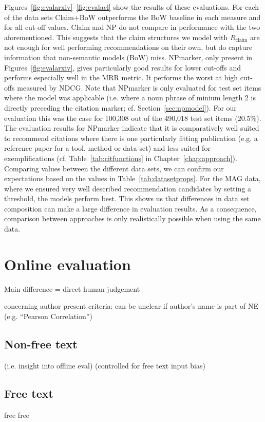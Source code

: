 Figures~\ref{fig:evalarxiv}--\ref{fig:evalacl} show the results of these evaluations. For each of the data sets Claim+BoW outperforms the BoW baseline in each measure and for all cut-off values. Claim and NP do not compare in performance with the two aforementioned. This suggests that the claim structures we model with $R_{\text{claim}}$ are not enough for well performing recommendations on their own, but do capture information that non-semantic models (BoW) miss. NPmarker, only present in Figures~\ref{fig:evalarxiv}, gives particularly good results for lower cut-offs and performs especially well in the MRR metric. It performs the worst at high cut-offs measured by NDCG. Note that NPmarker is only evaluated for test set items where the model was applicable (i.e. where a noun phrase of minium length 2 is directly preceding the citation marker; cf. Section~\ref{sec:npmodel}). For our evaluation this was the case for 100,308 out of the 490,018 test set items (20.5\%). The evaluation results for NPmarker indicate that it is comparatively well suited to recommend citations where there is one particularly fitting publication (e.g. a reference paper for a tool, method or data set) and less suited for exemplifications (cf. Table~\ref{tab:citfunctions} in Chapter~\ref{chap:approach}). Comparing values between the different data sets, we can confirm our expectations based on the values in Table~\ref{tab:datasetprops}. For the MAG data, where we ensured very well described recommendation candidates by setting a threshold, the models perform best.
This shows us that differences in data set composition can make a large difference in evaluation results. As a consequence, comparison between approaches is only realistically possible when using the same data.



\section{Online evaluation}\label{sec:oneval}
Main difference = direct human judgement

concerning author present criteria: can be unclear if author's name is part of NE (e.g. ``Pearson Correlation'')

\subsection{Non-free text}
(i.e. insight into offline eval)
(controlled for free text input bias)

\subsection{Free text}
free free
